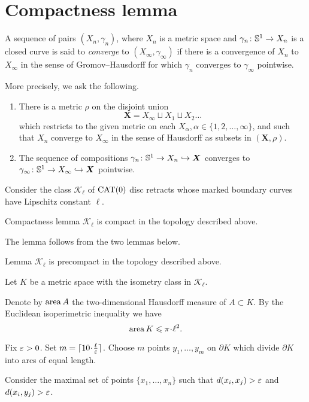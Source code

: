 \section{Compactness lemma}\label{Compactness}

A sequence of pairs $(X_n,\gamma_n)$, where $X_n$ is a metric space and $\gamma_n\colon\mathbb{S}^1\to X_n$ is a 
closed curve is said to \emph{converge} to $(X_\infty,\gamma_\infty)$ if there is a convergence of $X_n$ to $X_\infty$ 
in the sense of Gromov--Hausdorff for which $\gamma_n$ converges to $\gamma_\infty$ pointwise.

More precisely, we ask the following.
\begin{enumerate}[(1)]
	\item There is a metric $\rho$ on the disjoint union 
\[\bm{X}=X_\infty\sqcup X_1\sqcup X_2\dots\]
which restricts to the given metric on each $X_\alpha, \alpha\in\{1,2,\dots,\infty\}$, 
and such that $X_n$ converge to $X_\infty$ in the sense of Hausdorff as subsets in $(\bm{X},\rho)$.
\item  The sequence of compositions $\gamma_n\colon\mathbb{S}^1\to X_n \hookrightarrow\bm{X}$ 
converges to $\gamma_\infty\:\SS^1\zz\to X_\infty \hookrightarrow\bm{X}$ pointwise.
\end{enumerate}
Consider the class $\mathcal{K}_\ell$ of $\mathop{\rm CAT}\nolimits(0)$ disc retracts whose marked
boundary curves have Lipschitz constant $\ell$.


\begin{thm}{Compactness lemma}\label{lem:compact}
$\mathcal{K}_\ell$ is compact in the topology described above.
\end{thm}

The lemma follows from the two lemmas below.

\begin{thm}{Lemma}\label{lem:precompact}
$\mathcal{K}_\ell$ is precompact in the topology described above.
\end{thm}

Let $K$ be a metric space with the isometry class in $\mathcal {K}_\ell$.

Denote by $\mathop{\rm area}\nolimits A$ the two-dimensional Hausdorff measure of $A\subset K$.
By the Euclidean isoperimetric inequality we have 
\[\area K \le \pi\cdot\ell^2.\]

Fix $\varepsilon>0$. 
Set $m=\lceil 10\cdot\tfrac\ell\eps\rceil$.
Choose $m$ points $y_1,\dots,y_m$ on $\partial K$
which divide $\partial K$ into arcs of equal length.

Consider the maximal set of points $\{x_1,\dots,x_n\}$ such that $d(x_i,x_j)>\varepsilon$ and $d(x_i,y_j)>\varepsilon$.

